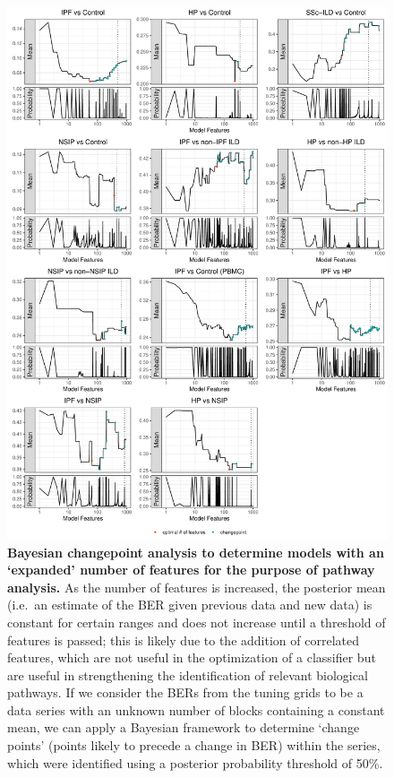 \documentclass[
]{article}
\begin{document}
\begin{figure}

{\centering \includegraphics[width=0.8\linewidth,]{./Figures/SysReview/FigE7_bayes} 

}

\caption[Bayesian changepoint analysis]{\textbf{Bayesian changepoint analysis to determine models with an ‘expanded’ number of features for the purpose of pathway analysis.} As the number of features is increased, the posterior mean (i.e.~an estimate of the BER given previous data and new data) is constant for certain ranges and does not increase until a threshold of features is passed; this is likely due to the addition of correlated features, which are not useful in the optimization of a classifier but are useful in strengthening the identification of relevant biological pathways. If we consider the BERs from the tuning grids to be a data series with an unknown number of blocks containing a constant mean, we can apply a Bayesian framework to determine `change points' (points likely to precede a change in BER) within the series, which were identified using a posterior probability threshold of 50\%.}\label{fig:bayes}
\end{figure}
\end{document}
